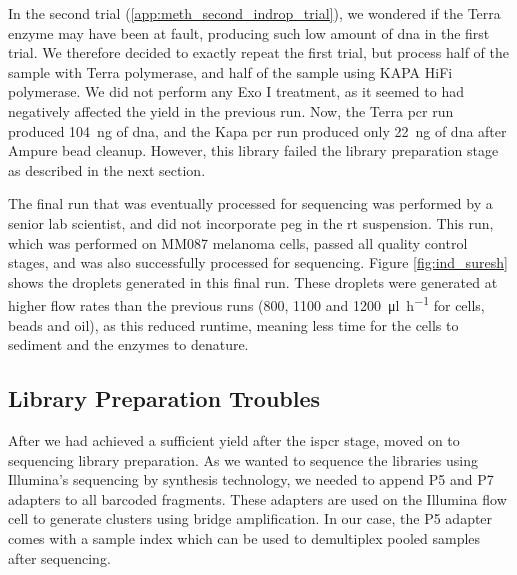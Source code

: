 In the second trial (\ref{app:meth_second_indrop_trial}), we wondered if the Terra enzyme may have been at fault, producing such low amount of \acrshort{dna} in the first trial. We therefore decided to exactly repeat the first trial, but process half of the sample with Terra polymerase, and half of the sample using KAPA HiFi polymerase. We did not perform any Exo I treatment, as it seemed to had negatively affected the yield in the previous run. Now, the Terra \acrshort{pcr} run produced \SI{104}{\ng} of \acrshort{dna}, and the Kapa \acrshort{pcr} run produced only \SI{22}{\ng} of \acrshort{dna} after Ampure bead cleanup. However, this library failed the library preparation stage as described in the next section.\pms

The final run that was eventually processed for sequencing was performed by a senior lab scientist, and did not incorporate \acrshort{peg} in the \acrshort{rt} suspension. This run, which was performed on MM087 melanoma cells, passed all quality control stages, and was also successfully processed for sequencing. Figure \ref{fig:ind_suresh} shows the droplets generated in this final run. These droplets were generated at higher flow rates than the previous runs (800, 1100 and \SI{1200}{\ul\per\hour} for cells, beads and oil), as this reduced runtime, meaning less time for the cells to sediment and the enzymes to denature.\pms

\subsection{Library Preparation Troubles}
After we had achieved a sufficient yield after the \acrshort{ispcr} stage, moved on to sequencing library preparation. As we wanted to sequence the libraries using Illumina's sequencing by synthesis technology, we needed to append P5 and P7 adapters to all barcoded fragments. These adapters are used on the Illumina flow cell to generate clusters using bridge amplification. In our case, the P5 adapter comes with a sample index which can be used to demultiplex pooled samples after sequencing.\pms


